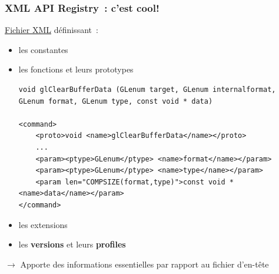 \begin{frame}[fragile]
  \frametitle{XML API Registry~:  c'est cool!}
  \href{https://www.opengl.org/registry}{Fichier XML} définissant~: \\
  \begin{itemize}
    \item les constantes
    \item les fonctions et leurs prototypes \\
      {\tiny%
\begin{verbatim}
void glClearBufferData (GLenum target, GLenum internalformat, GLenum format, GLenum type, const void * data)

<command>
    <proto>void <name>glClearBufferData</name></proto>
    ...
    <param><ptype>GLenum</ptype> <name>format</name></param>
    <param><ptype>GLenum</ptype> <name>type</name></param>
    <param len="COMPSIZE(format,type)">const void *<name>data</name></param>
</command>
\end{verbatim}}
    \item les extensions
    \item les \textbf{versions} et leurs \textbf{profiles}
  \end{itemize}
  \centerline{\alert{$\longrightarrow$ Apporte des informations essentielles par rapport au fichier d'en-tête}}
  \note{
    \begin{enumerate}
    \item 
    \end{enumerate}
  }
\end{frame}

